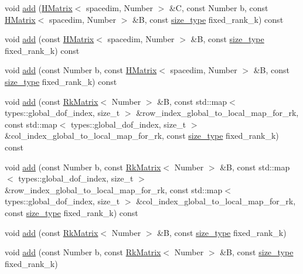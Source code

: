 \begin{DoxyCompactItemize}
\item 
void \hyperlink{classHMatrix_aea42f5112b88270fef73342853fa386d}{add} (\hyperlink{classHMatrix}{H\+Matrix}$<$ spacedim, Number $>$ \&C, const Number b, const \hyperlink{classHMatrix}{H\+Matrix}$<$ spacedim, Number $>$ \&B, const \hyperlink{classHMatrix_a5ca8dc549783d38371a01ecd621ecb34}{size\+\_\+type} fixed\+\_\+rank\+\_\+k) const
\item 
void \hyperlink{classHMatrix_a9bd48ada567962ab0dc75c31986bd1a6}{add} (const \hyperlink{classHMatrix}{H\+Matrix}$<$ spacedim, Number $>$ \&B, const \hyperlink{classHMatrix_a5ca8dc549783d38371a01ecd621ecb34}{size\+\_\+type} fixed\+\_\+rank\+\_\+k) const
\item 
void \hyperlink{classHMatrix_af42aaa86b9f47c5c1514e4f06e343db6}{add} (const Number b, const \hyperlink{classHMatrix}{H\+Matrix}$<$ spacedim, Number $>$ \&B, const \hyperlink{classHMatrix_a5ca8dc549783d38371a01ecd621ecb34}{size\+\_\+type} fixed\+\_\+rank\+\_\+k) const
\item 
void \hyperlink{classHMatrix_a1793dff400aeae649f909d7f45db8b8a}{add} (const \hyperlink{classRkMatrix}{Rk\+Matrix}$<$ Number $>$ \&B, const std\+::map$<$ types\+::global\+\_\+dof\+\_\+index, size\+\_\+t $>$ \&row\+\_\+index\+\_\+global\+\_\+to\+\_\+local\+\_\+map\+\_\+for\+\_\+rk, const std\+::map$<$ types\+::global\+\_\+dof\+\_\+index, size\+\_\+t $>$ \&col\+\_\+index\+\_\+global\+\_\+to\+\_\+local\+\_\+map\+\_\+for\+\_\+rk, const \hyperlink{classHMatrix_a5ca8dc549783d38371a01ecd621ecb34}{size\+\_\+type} fixed\+\_\+rank\+\_\+k) const
\item 
void \hyperlink{classHMatrix_ad3800d6fded523d5c8eeb8fd0c106a34}{add} (const Number b, const \hyperlink{classRkMatrix}{Rk\+Matrix}$<$ Number $>$ \&B, const std\+::map$<$ types\+::global\+\_\+dof\+\_\+index, size\+\_\+t $>$ \&row\+\_\+index\+\_\+global\+\_\+to\+\_\+local\+\_\+map\+\_\+for\+\_\+rk, const std\+::map$<$ types\+::global\+\_\+dof\+\_\+index, size\+\_\+t $>$ \&col\+\_\+index\+\_\+global\+\_\+to\+\_\+local\+\_\+map\+\_\+for\+\_\+rk, const \hyperlink{classHMatrix_a5ca8dc549783d38371a01ecd621ecb34}{size\+\_\+type} fixed\+\_\+rank\+\_\+k) const
\item 
void \hyperlink{classHMatrix_ab9000d7604e2045cf7cad7458daca340}{add} (const \hyperlink{classRkMatrix}{Rk\+Matrix}$<$ Number $>$ \&B, const \hyperlink{classHMatrix_a5ca8dc549783d38371a01ecd621ecb34}{size\+\_\+type} fixed\+\_\+rank\+\_\+k)
\item 
void \hyperlink{classHMatrix_a94981e45b7d9aa0f2afae77d414f1c1a}{add} (const Number b, const \hyperlink{classRkMatrix}{Rk\+Matrix}$<$ Number $>$ \&B, const \hyperlink{classHMatrix_a5ca8dc549783d38371a01ecd621ecb34}{size\+\_\+type} fixed\+\_\+rank\+\_\+k)

\end{DoxyCompactItemize}
